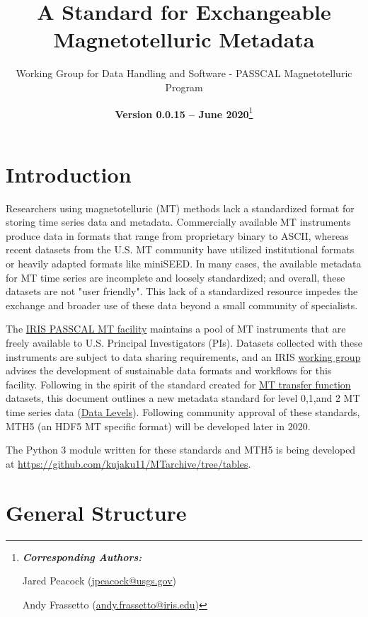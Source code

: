 \documentclass[12pt]{article}
\title{A Standard for Exchangeable Magnetotelluric Metadata}
\date{\textbf{Version 0.0.15 -- June 2020}\footnote{\noindent\textbf{\textit{Corresponding Authors:}}
		
		Jared Peacock (\url{jpeacock@usgs.gov})
		
		Andy Frassetto (\url{andy.frassetto@iris.edu})}}
\author[1]{Working Group for Data Handling and Software - PASSCAL Magnetotelluric Program}
\affil[1]{Portable Array Seismic Studies of the Continental Lithosphere, Incorporated Research Institutions for Seismology}
\begin{document}
	
\maketitle

\clearpage
\newpage
\tableofcontents
{}
\listoftables
\vspace{1cm}


\newpage

\section{Introduction}

Researchers using magnetotelluric (MT) methods lack a standardized format for storing time series data and metadata. Commercially available MT instruments produce data in formats that range from proprietary binary to ASCII, whereas recent datasets from the U.S. MT community have utilized institutional formats or heavily adapted formats like miniSEED. In many cases, the available metadata for MT time series are incomplete and loosely standardized; and overall, these datasets are not "user friendly". This lack of a standardized resource impedes the exchange and broader use of these data beyond a small community of specialists.

The \href{https://www.iris.edu/hq/programs/passcal/magnetotelluricnstrumentation}{IRIS PASSCAL MT facility} maintains a pool of MT instruments that are freely available to U.S. Principal Investigators (PIs). Datasets collected with these instruments are subject to data sharing requirements, and an IRIS \href{https://www.iris.edu/hq/aboutris/governance/mtoft}{working group} advises the development of sustainable data formats and workflows for this facility. Following in the spirit of the standard created for \href{https://library.seg.org/doi/10.1190/geo2018-0679.1}{MT transfer function} datasets, this document outlines a new metadata standard for level 0,1,and 2 MT time series data (\href{https://earthdata.nasa.gov/collaborate/open-data-services-and-software/data-information-policy/data-levels}{Data Levels}). Following community approval of these standards, MTH5 (an HDF5 MT specific format) will be developed later in 2020.

The Python 3 module written for these standards and MTH5 is being developed at \url{https://github.com/kujaku11/MTarchive/tree/tables}.

\section{General Structure}
\end{document}
